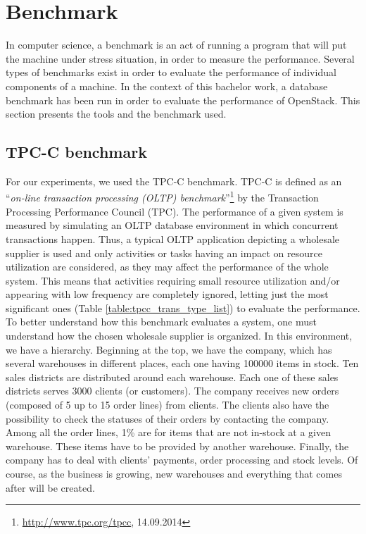 

\chapter{Benchmark}
In computer science, a benchmark is an act of running a program that will put the machine under stress situation, in order to measure the performance. 
Several types of benchmarks exist in order to evaluate the performance of individual components of a machine. 
In the context of this bachelor work, a database benchmark has been run in order to evaluate the performance of OpenStack.
This section presents the tools and the benchmark used.

\section{TPC-C benchmark}
For our experiments, we used the TPC-C benchmark. 
TPC-C is defined as an \enquote{\textit{on-line transaction processing (OLTP) benchmark}}\footnote{\url{http://www.tpc.org/tpcc}, 14.09.2014} by the Transaction Processing Performance Council (TPC).
The performance of a given system is measured by simulating an OLTP database environment in which concurrent transactions happen.
Thus, a typical OLTP application depicting a wholesale supplier is used 
and only activities or tasks having an impact on resource utilization are considered, as they may affect the performance of the whole system.
This means that activities requiring small resource utilization and/or appearing with low frequency are completely ignored, 
letting just the most significant ones (Table \ref{table:tpcc_trans_type_list}) to evaluate the performance.
To better understand how this benchmark evaluates a system, one must understand how the chosen wholesale supplier is organized.
In this environment, we have a hierarchy. 
Beginning at the top, we have the company, which has several warehouses in different places, each one having 100000 items in stock.
Ten sales districts are distributed around each warehouse.
Each one of these sales districts serves 3000 clients (or customers).
The company receives new orders (composed of 5 up to 15 order lines) from clients.
The clients also have the possibility to check the statuses of their orders by contacting the company.
Among all the order lines, 1\% are for items that are not in-stock at a given warehouse.
These items have to be provided by another warehouse.
Finally, the company has to deal with clients' payments, order processing and stock levels.
Of course, as the business is growing, new warehouses and everything that comes after will be created.

